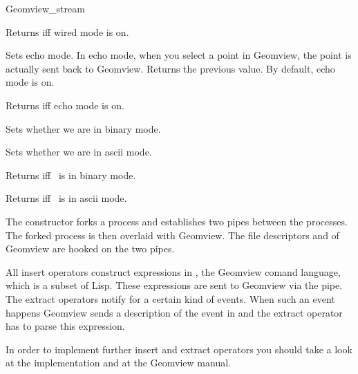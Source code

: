 \begin{ccClass}{Geomview_stream}
\begin{ccAdvanced}
{Returns  iff wired mode is on.}

{Sets echo mode.  In echo mode, when you select a point in Geomview, the point
 is actually sent back to Geomview.
 Returns the previous value. By default, echo mode is on.}

{Returns  iff echo mode is on.}

{Sets whether we are in binary mode.}

{Sets whether we are in ascii mode.}

{Returns  iff \ccVar\ is in binary mode.}

{Returns  iff \ccVar\ is in ascii mode.}

\end{ccAdvanced}


\ccImplementation

The constructor forks a process and establishes two pipes between the
processes. The forked process is then overlaid with Geomview. The
file descriptors  and  of Geomview are hooked
on the two pipes.

All insert operators construct expressions in , the Geomview
comand language, which is a subset of {\sc Lisp}. These expressions
are sent to Geomview via the pipe. The extract operators notify 
for a certain kind of events. When such an event happens Geomview
sends a description of the event in  and the extract operator has
to parse this expression.

In order to implement further insert and extract operators you should
take a look at the implementation and at the Geomview manual.
\end{ccClass}

